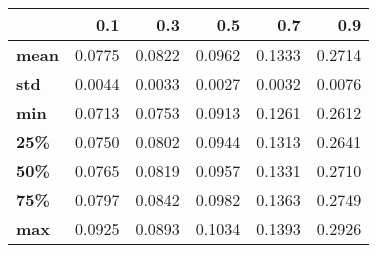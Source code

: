 \begin{tabular}{lrrrrr}
\toprule
{} &     0.1 &     0.3 &     0.5 &     0.7 &     0.9 \\
\midrule
\textbf{mean} &  0.0775 &  0.0822 &  0.0962 &  0.1333 &  0.2714 \\
\textbf{std } &  0.0044 &  0.0033 &  0.0027 &  0.0032 &  0.0076 \\
\textbf{min } &  0.0713 &  0.0753 &  0.0913 &  0.1261 &  0.2612 \\
\textbf{25\% } &  0.0750 &  0.0802 &  0.0944 &  0.1313 &  0.2641 \\
\textbf{50\% } &  0.0765 &  0.0819 &  0.0957 &  0.1331 &  0.2710 \\
\textbf{75\% } &  0.0797 &  0.0842 &  0.0982 &  0.1363 &  0.2749 \\
\textbf{max } &  0.0925 &  0.0893 &  0.1034 &  0.1393 &  0.2926 \\
\bottomrule
\end{tabular}
